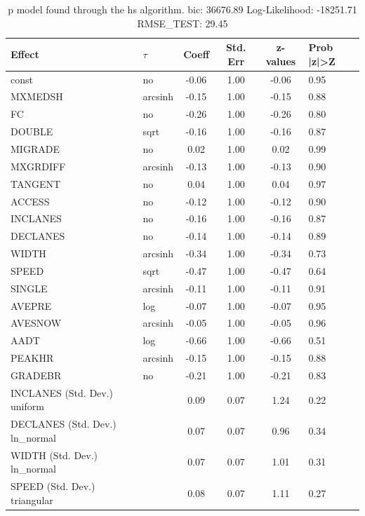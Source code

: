 \begin{table}
	\caption{p model found through the hs algorithm. bic: 36676.89 Log-Likelihood: -18251.71 RMSE_TEST: 29.45}
	\begin{center}
		\begin{tabular}{|l|l|c|c|c|l|}
			\hline
			Effect & $\tau$ & Coeff & Std. Err & z-values & Prob |z|>Z \\
			\hline
			const & no & -0.06 & 1.00 & -0.06 & 0.95 \\
			\hline
			MXMEDSH & arcsinh & -0.15 & 1.00 & -0.15 & 0.88 \\
			\hline
			FC & no & -0.26 & 1.00 & -0.26 & 0.80 \\
			\hline
			DOUBLE & sqrt & -0.16 & 1.00 & -0.16 & 0.87 \\
			\hline
			MIGRADE & no & 0.02 & 1.00 & 0.02 & 0.99 \\
			\hline
			MXGRDIFF & arcsinh & -0.13 & 1.00 & -0.13 & 0.90 \\
			\hline
			TANGENT & no & 0.04 & 1.00 & 0.04 & 0.97 \\
			\hline
			ACCESS & no & -0.12 & 1.00 & -0.12 & 0.90 \\
			\hline
			INCLANES & no & -0.16 & 1.00 & -0.16 & 0.87 \\
			\hline
			DECLANES & no & -0.14 & 1.00 & -0.14 & 0.89 \\
			\hline
			WIDTH & arcsinh & -0.34 & 1.00 & -0.34 & 0.73 \\
			\hline
			SPEED & sqrt & -0.47 & 1.00 & -0.47 & 0.64 \\
			\hline
			SINGLE & arcsinh & -0.11 & 1.00 & -0.11 & 0.91 \\
			\hline
			AVEPRE & log & -0.07 & 1.00 & -0.07 & 0.95 \\
			\hline
			AVESNOW & arcsinh & -0.05 & 1.00 & -0.05 & 0.96 \\
			\hline
			AADT & log & -0.66 & 1.00 & -0.66 & 0.51 \\
			\hline
			PEAKHR & arcsinh & -0.15 & 1.00 & -0.15 & 0.88 \\
			\hline
			GRADEBR & no & -0.21 & 1.00 & -0.21 & 0.83 \\
			\hline
			INCLANES (Std. Dev.) uniform &  & 0.09 & 0.07 & 1.24 & 0.22 \\
			\hline
			DECLANES (Std. Dev.) ln_normal &  & 0.07 & 0.07 & 0.96 & 0.34 \\
			\hline
			WIDTH (Std. Dev.) ln_normal &  & 0.07 & 0.07 & 1.01 & 0.31 \\
			\hline
			SPEED (Std. Dev.) triangular &  & 0.08 & 0.07 & 1.11 & 0.27 \\

\end{tabular}
\end{center}
\end{table}
